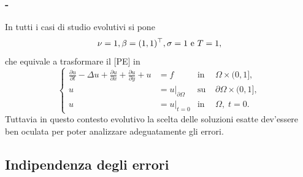 \documentclass[11pt]{beamer}
\newcommand{\derP}[2]{\frac{\partial#1}{\partial#2}}
\newcommand{\SpaziaturaMate}[3]{
    \setlength{\thinmuskip}{#1mu}
    \setlength{\medmuskip}{#2mu}
    \setlength{\thickmuskip}{#3mu}
}
\begin{document}
             \begin{frame}\frametitle{\titoloSez{} - \insertsubsection{}}
                In tutti i casi di studio evolutivi si pone
                \begin{equation*}
                    \setlength{\abovedisplayskip}{5pt plus 2pt minus 2pt}  %
                    \setlength{\belowdisplayskip}{5pt plus 2pt minus 2pt}  %
                    \nu=1,\beta=(1,1)^{\top},\sigma=1\text{ e }T=1,
                \end{equation*}
                che equivale a trasformare il {[PE]} in
                \begin{equation}
                    \left\{
                    \begin{aligned}
                        \derP ut-\Delta u+\derP ux+\derP uy+u&=f&\text{in }&\Omega\times(0,1], \\
                                u&=u\vert_{\partial\Omega}&\text{su }&\partial\Omega\times(0,1],\\
                        u&=u\vert_{t=0} &\text{in }&\Omega,\;t=0.
                    \end{aligned}
                    \right.
                    \label{eqPETS12}
                \end{equation}
                Tuttavia in questo contesto evolutivo la scelta delle soluzioni esatte dev'essere ben oculata per poter analizzare adeguatamente gli errori.
            \end{frame}
            
        \subsection{Indipendenza degli errori}
\end{document}
